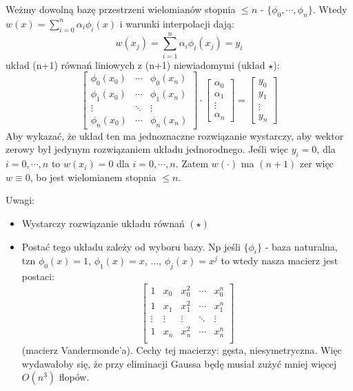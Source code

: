 \documentclass[hidelinks,a4paper,fleqn,oneside]{book}
\begin{document}
Weżmy dowolną bazę przestrzeni wielomianów stopnia $\leq n$ - $\{\phi_0, \cdots, \phi_n\}$. Wtedy $w(x) = \sum_{i=0}^{n} \alpha_i \phi_i(x)$ i warunki interpolacji dają:
\[
w(x_j) = \sum\limits_{i=1}^{n} \alpha_i\phi_i(x_j) = y_i
\]
układ (n+1) równań liniowych z (n+1) niewiadomymi (układ $\star$):
\[
\left[
	\begin{array}{ccc}
		\phi_0(x_0) & \cdots & \phi_0(x_n) \\
		\phi_1(x_0) & \cdots & \phi_1(x_n) \\
		\vdots & \ddots & \vdots \\
		\phi_n(x_0) & \cdots & \phi_n(x_n)
	\end{array}
\right]
\cdot
\left[
	\begin{array}{c}
		\alpha_0 \\
		\alpha_1 \\
		\vdots \\
		\alpha_n

	\end{array}
\right]
=
\left[
	\begin{array}{c}
		y_0 \\
		y_1 \\
		\vdots \\
		y_n
	\end{array}
\right]
\]
Aby wykazać, że układ ten ma jednoznaczne rozwiązanie wystarczy, aby wektor zerowy był jedynym rozwiązaniem układu jednorodnego. Jeśli więc $y_i = 0$, dla $i = 0, \cdots, n$ to $w(x_i) = 0$ dla $i = 0, \cdots, n$. Zatem $w(\cdot)$ ma $(n+1)$ zer więc $w \equiv 0$, bo jest wielomianem stopnia $\leq n$.

Uwagi:
\begin{itemize}
	\item Wystarczy rozwiązanie układu równań $(\star)$
	\item Postać tego układu zależy od wyboru bazy. Np jeśli $\{\phi_i\}$ - baza naturalna, tzn $\phi_0(x) = 1$, $\phi_1(x) = x$, ..., $\phi_j(x) = x^j$ to wtedy nasza macierz jest postaci:
\[
\left[
	\begin{array}{ccccc}
		1 & x_0 & x_0^2 & \cdots & x_0 ^ n \\
		1 & x_1 & x_1^2 & \cdots & x_1 ^ n \\
		\vdots & \vdots & \vdots & \ddots & \vdots \\
		1 & x_n & x_n^2 & \cdots & x_n ^ n \\
	\end{array}
\right]
\]
(macierz Vandermonde'a). Cechy tej macierzy: gęsta, niesymetryczna. Więc wydawałoby się, że przy eliminacji Gaussa będę musiał zużyć mniej więcej $O(n^3)$ flopów.
\end{itemize}
\end{document}
